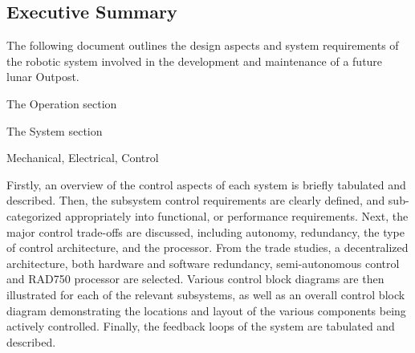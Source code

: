

\vspace*{\fill}
\begin{center}
\section*{Executive Summary}
\end{center}
The following document outlines the design aspects and system requirements of the robotic system involved in the development and maintenance of a future lunar Outpost.

The Operation section

The System section

Mechanical, Electrical, Control

Firstly, an overview of the control aspects of each system is briefly tabulated and described. Then, the subsystem control requirements are clearly defined, and sub-categorized appropriately into functional, or performance requirements. Next, the major control trade-offs are discussed, including autonomy, redundancy, the type of control architecture, and the processor. From the trade studies, a decentralized architecture, both hardware and software redundancy, semi-autonomous control and RAD750 processor are selected. Various control block diagrams are then illustrated for each of the relevant subsystems, as well as an overall control block diagram demonstrating the locations and layout of the various components being actively controlled. Finally, the feedback loops of the system are tabulated and described.
\vspace*{\fill}

